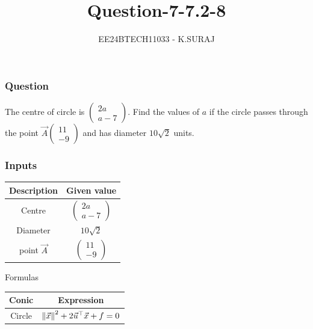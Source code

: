 \documentclass{beamer}
\title{Question-7-7.2-8}
\author{EE24BTECH11033 - K.SURAJ}
\date{}
\begin{document}
\frame{\titlepage}
\begin{frame}
\frametitle{Question}
The centre of circle is $\begin{pmatrix}2a\\a-7\end{pmatrix}$. Find the values of $a$ if the circle passes through the point $\vec{A}\begin{pmatrix}11\\-9\end{pmatrix}$ and has diameter $10\sqrt{2}$ units.
\end{frame}
\begin{frame}
\frametitle{Inputs}

  \centering
\begin{tabular}{ |c| c|}
    \hline
    \textbf{Description}  & \textbf{ Given value}\\
    \hline
    Centre  & $\begin{pmatrix}2a\\a-7\end{pmatrix}$\\
    \hline
    Diameter & $10\sqrt{2}$\\
    \hline
    point $\vec{A}$ & $\begin{pmatrix}11\\-9\end{pmatrix}$\\
    \hline
\end{tabular}


    
\end{frame}
\begin{frame}{Formulas}
    \centering
\begin{tabular}{ |c|c|}
    \hline
    \textbf{Conic} & \textbf{Expression}\\ 
    \hline
    Circle & $\norm{\vec{x}}^2 + 2 \vec{u}^\top\vec{x} + f = 0$ \\
    \hline
   
\end{tabular}
\end{frame}
\end{document}
